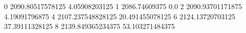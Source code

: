 0 2090.80517578125 4.05908203125
1 2086.74609375 0.0
2 2090.93701171875 4.19091796875
4 2107.237548828125 20.491455078125
6 2124.13720703125 37.39111328125
8 2139.849365234375 53.103271484375
